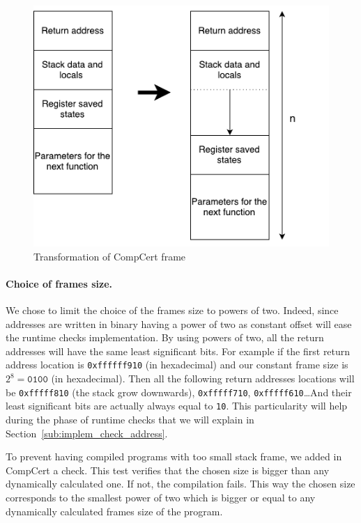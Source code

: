 \documentclass[11pt]{sdm}
\begin{document}
\begin{figure}[!ht]
\centering
\includegraphics[scale=0.6]{images/frame_transform.pdf}
\caption{Transformation of CompCert frame}
\label{frame_transform}
\end{figure}

\paragraph{Choice of frames size.}
\label{par:Choice of frames size}

We chose to limit the choice of the frames size to powers of two. Indeed, since addresses are written in binary having a power of two as constant offset will ease the runtime checks implementation. By using powers of two, all the return addresses will have the same least significant bits. For example if the first return address location is \texttt{0xffffff910} (in hexadecimal) and our constant frame size is $2^8 = \texttt{0100}$ (in hexadecimal). Then all the following return addresses locations will be \texttt{0xfffff810} (the stack grow downwards), \texttt{0xfffff710}, \texttt{0xfffff610}\dots And their least significant bits are actually always equal to \texttt{10}. This particularity will help during the phase of runtime checks that we will explain in Section~\ref{sub:implem_check_address}.

To prevent having compiled programs with too small stack frame, we added in CompCert a check. This test verifies that the chosen size is bigger than any dynamically calculated one. If not, the compilation fails. This way the chosen size corresponds to the smallest power of two which is bigger or equal to any dynamically calculated frames size of the program.
\end{document}
